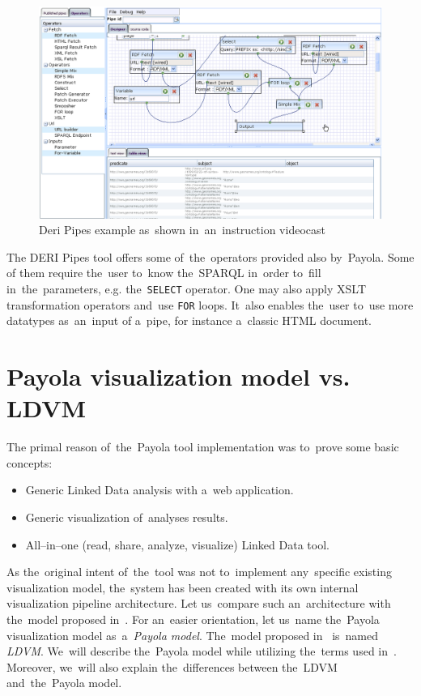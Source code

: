 \begin{figure}
	\centering
	\includegraphics[width=140mm]{img/deri.png}
	\caption{Deri Pipes example as~shown in~an~instruction videocast~\cite{deri-screen-source}}
	\label{fig:deri}
\end{figure}

The DERI Pipes tool offers some of~the~operators provided also by~Payola. Some 
of them require the~user to~know the~SPARQL in~order to~fill in~the~parameters, e.g. the~\texttt{SELECT} operator. One may also apply XSLT 
transformation operators and~use \texttt{FOR} loops. It~also enables the~user to~use more datatypes as~an~input 
of a~pipe, for instance a~classic HTML document.

\section{Payola visualization model vs. LDVM}
\label{sec:rw:ldvm}
The primal reason of~the~Payola tool implementation was to~prove some basic concepts:

\begin{itemize}
\item Generic Linked Data analysis with a~web application.
\item Generic visualization of~analyses results.
\item All--in--one (read, share, analyze, visualize) Linked Data tool.
\end{itemize}

As the~original intent of~the~tool was not to~implement any~specific existing visualization model,
the~system has been created with its own internal visualization pipeline architecture. Let us~compare such
an~architecture with the~model proposed in~\cite{ldvm}. For an~easier orientation, let us~name the~Payola visualization 
model as~a~\emph{Payola model}. The~model proposed in~\cite{ldvm} is~named \emph{LDVM}. We~will describe the~Payola
model while utilizing the~terms used in~\cite{ldvm}. Moreover, we~will also explain
the~differences between the~LDVM and~the~Payola model.

